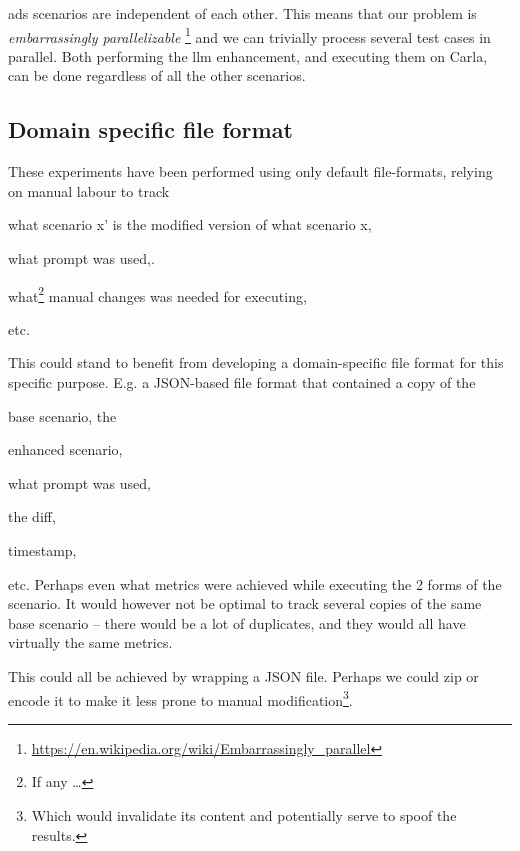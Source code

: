 \acrshort{ads} scenarios are independent of each other. This means that our problem is
\textit{embarrassingly parallelizable}
\footnote{\url{https://en.wikipedia.org/wiki/Embarrassingly_parallel}} and we can trivially process
several test cases in parallel. Both performing the \acrshort{llm} enhancement, and executing them
on Carla, can be done regardless of all the other scenarios.


\subsection{Domain specific file format}

These experiments have been performed using only default file-formats, relying on manual labour to
track \begin{inparaenum}
    \item what scenario x' is the modified version of what scenario x,
    \item what prompt was used,.
    \item what\footnote{If any \ldots} manual changes was needed for executing,
\end{inparaenum} etc.

This could stand to benefit from developing a domain-specific file format for this specific purpose.
E.g. a JSON-based file format that contained a copy of the \begin{inparaenum}
    \item base scenario, the
    \item enhanced scenario,
    \item what prompt was used,
    \item the diff,
    \item timestamp,
\end{inparaenum} etc. Perhaps even what metrics were achieved while executing the 2 forms of the
scenario. It would however not be optimal to track several copies of the same base scenario -- there
would be a lot of duplicates, and they would all have virtually the same metrics.

This could all be achieved by wrapping a JSON file. Perhaps we could zip or encode it to make it
less prone to manual modification\footnote{Which would invalidate its content and potentially serve
    to spoof the results.}.
